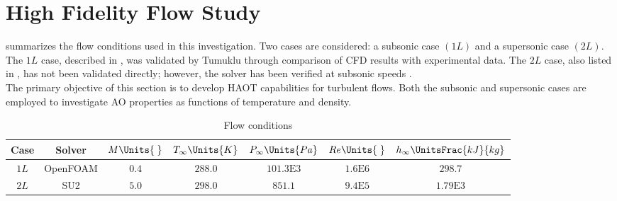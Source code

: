 \section{High Fidelity Flow Study\label{sec:lesStudy}}
 summarizes the flow
conditions used in this investigation. Two cases are considered: a subsonic
case $(1L)$ and a supersonic case $(2L)$. The $1L$ case, described in
, was validated by Tumuklu \cite{Tumuklu2024} through
comparison of \gls{CFD} results with experimental data. The $2L$ case, also
listed in , has not been validated directly; however, the
solver has been verified at subsonic speeds \cite{Molina2017}. \\

The primary objective of this section is to develop \gls{HAOT} capabilities for
turbulent flows. Both the subsonic and supersonic cases are employed to
investigate \gls{AO} properties as functions of temperature and density.
\begin{table}[H]
    \begin{center}
        \begin{tabular}{|c|c|c|c|c|c|c|}
            \hline
            Case & Solver & $M\Units{\;}$ & $T_{\infty}\Units{K}$ &
            $P_{\infty}\Units{Pa}$ & $Re\Units{\;}$ & $h_{\infty}
            \UnitsFrac{kJ}{kg}$  \\ 
            \hline \hline
            $1L$ & OpenFOAM & $0.4$ & $288.0$ & $101.3\mathrm{E}{3}$ &
            $1.6\mathrm{E}{6}$ &$298.7$ \\ \hline
            $2L$ & SU2 & $5.0$ & $298.0$ & $851.1$ & $9.4\mathrm{E}{5}$ &
            $1.79\mathrm{E}{3}$ \\ \hline
        \end{tabular}
    \caption{Flow conditions \label{tab:lesStudy}}
    \end{center}
\end{table}



